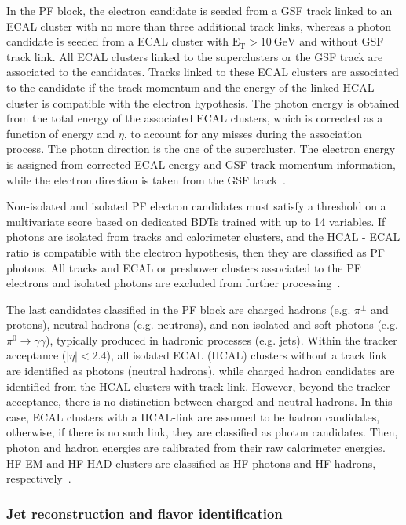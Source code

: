 In the PF block, the electron candidate is seeded from a GSF track linked to an ECAL cluster with no more than three additional track links, whereas a photon candidate is seeded from a ECAL cluster with $\mathrm{E_{T}>10~GeV}$ and without GSF track link. All ECAL clusters linked to the superclusters or the GSF track are associated to the candidates. Tracks linked to these ECAL clusters are associated to the candidate if the track momentum and the energy of the linked HCAL cluster is compatible with the electron hypothesis. The photon energy is obtained from the total energy of the associated ECAL clusters, which is corrected as a function of energy and $\eta$, to account for any misses during the association process. The photon direction is the one of the supercluster. The electron energy is assigned from corrected ECAL energy and GSF track momentum information, while the electron direction is taken from the GSF track~\cite{cmspfalgo}.  

Non-isolated and isolated PF electron candidates must satisfy a threshold on a multivariate score based on dedicated BDTs trained with up to 14 variables. If photons are isolated from tracks and calorimeter clusters, and the HCAL - ECAL ratio is compatible with the electron hypothesis, then they are classified as PF photons. All tracks and ECAL or preshower clusters associated to the PF electrons and isolated photons are excluded from further processing~\cite{cmspfalgo}.

The last candidates classified in the PF block are charged hadrons (e.g. $\pi^{\pm}$ and protons), neutral hadrons (e.g. neutrons), and non-isolated and soft photons (e.g. $\pi^{0}\rightarrow\gamma\gamma$), typically produced in hadronic processes (e.g. jets). Within the tracker acceptance ($|\eta|<2.4$), all isolated ECAL (HCAL) clusters without a track link are identified as photons (neutral hadrons), while charged hadron candidates are identified from the HCAL clusters with track link. However, beyond the tracker acceptance, there is no distinction between charged and neutral hadrons. In this case, ECAL clusters with a HCAL-link are assumed to be hadron candidates, otherwise, if there is no such link, they are classified as photon candidates. Then, photon and hadron energies are calibrated from their raw calorimeter energies. HF EM and HF HAD clusters are classified as HF photons and HF hadrons, respectively~\cite{cmspfalgo}.

\subsubsection{Jet reconstruction and flavor identification}

